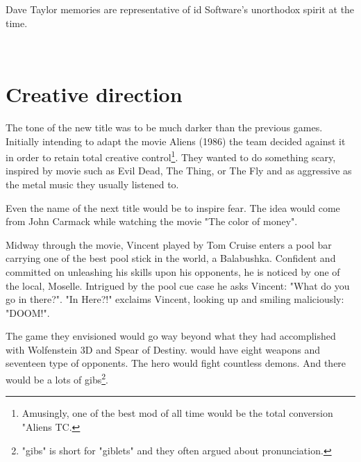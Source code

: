 \par
Dave Taylor memories are representative of id Software's unorthodox spirit at the time.\\
\par
{}\\
\par
{}





\section{Creative direction}
The tone of the new title was to be much darker than the previous games. Initially intending to adapt the movie Aliens (1986) the team decided against it in order to retain total creative control\footnote{Amusingly, one of the best mod of all time would be the total conversion "Aliens TC.}. They wanted to do something scary, inspired by movie such as Evil Dead, The Thing, or The Fly and as aggressive as the metal music they usually listened to.\\
\par
Even the name of the next title would be to inspire fear. The idea would come from John Carmack while watching the movie "The color of money".\\ 
\par
Midway through the movie, Vincent played by Tom Cruise enters a pool bar carrying one of the best pool stick in the world, a Balabushka. Confident and committed on unleashing his skills upon his opponents, he is noticed by one of the local, Moselle. Intrigued by the pool cue case he asks Vincent: "What do you go in there?". "In Here?!" exclaims Vincent, looking up and smiling maliciously: "DOOM!".\\
\par

\par
{}
\par
\vspace{-5pt}
The game they envisioned would go way beyond what they had accomplished with Wolfenstein 3D and Spear of Destiny. \doom{} would have eight weapons and seventeen type of opponents. The hero would fight countless demons. And there would be a lots of gibs\footnote{"gibs" is short for "giblets" and they often argued about pronunciation.}.

